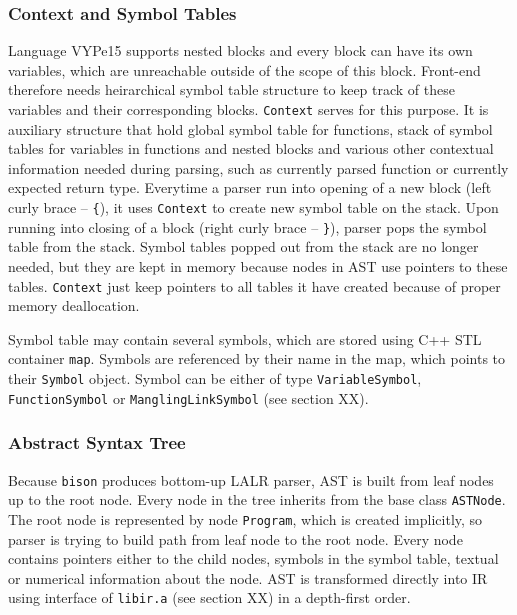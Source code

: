 \documentclass[12pt]{article}
\begin{document}
\subsubsection{Context and Symbol Tables}
Language VYPe15 supports nested blocks and every block can have its own variables, which are unreachable outside of the scope of this block. Front-end
therefore needs heirarchical symbol table structure to keep track of these variables and their corresponding blocks. \texttt{Context} serves for this purpose.
It is auxiliary structure that hold global symbol table for functions, stack of symbol tables for variables in functions and nested blocks
and various other contextual information needed during parsing, such as currently parsed function
or currently expected return type. Everytime a parser run into opening of a new block (left curly brace -- \texttt{\{}), it uses \texttt{Context} to create
new symbol table on the stack. Upon running into closing of a block (right curly brace -- \texttt{\}}), parser pops the symbol table from the stack. Symbol tables
popped out from the stack are no longer needed, but they are kept in memory because nodes in AST use pointers to these tables. \texttt{Context} just keep
pointers to all tables it have created because of proper memory deallocation.

Symbol table may contain several symbols, which are stored using C++ STL container \texttt{map}. Symbols are referenced by their name in the map,
which points to their \texttt{Symbol} object. Symbol can be either of type \texttt{VariableSymbol}, \texttt{FunctionSymbol} or \texttt{ManglingLinkSymbol}
(see section XX).

\subsubsection{Abstract Syntax Tree}
Because \texttt{bison} produces bottom-up LALR parser, AST is built from leaf nodes up to the root node. Every node in the tree inherits from the
base class \texttt{ASTNode}. The root node is represented by node \texttt{Program}, which is created implicitly, so parser is trying to build
path from leaf node to the root node. Every node contains pointers either to the child nodes, symbols in the symbol table, textual or numerical
information about the node. AST is transformed directly into IR using interface of \texttt{libir.a} (see section XX) in a depth-first order.
\end{document}
